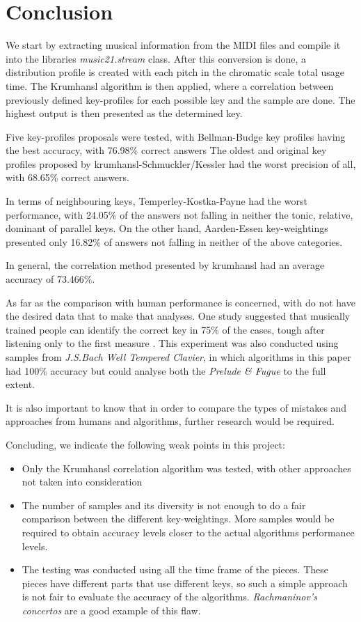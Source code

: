 \section{Conclusion} \label{sec:conclusion}

We start by extracting musical information from the MIDI files and compile it into the libraries \textit{music21.stream} class.
After this conversion is done, a distribution profile is created with each pitch in the chromatic scale total usage time.
The Krumhansl algorithm is then applied, where a correlation between previously defined key-profiles for each possible key and the sample are done.
The highest output is then presented as the determined key.

Five key-profiles proposals were tested, with Bellman-Budge key profiles having the best accuracy, with 76.98\% correct answers
The oldest and original key profiles proposed by krumhansl-Schmuckler/Kessler had the worst precision of all, with 68.65\% correct answers.

In terms of neighbouring keys, Temperley-Kostka-Payne had the worst performance, with 24.05\% of the answers not falling in neither the tonic, relative, dominant of parallel keys.
On the other hand, Aarden-Essen key-weightings presented only 16.82\% of answers not falling in neither of the above categories.

In general, the correlation method presented by krumhansl had an average accuracy of 73.466\%.

As far as the comparison with human performance is concerned, with do not have the desired data that to make that analyses.
One study suggested that musically trained people can identify the correct key in 75\% of the cases, tough after listening only to the first measure \cite{cohen1977tonality}.
This experiment was also conducted using samples from \textit{J.S.Bach Well Tempered Clavier}, in which algorithms in this paper had 100\% accuracy but could analyse both the \textit{Prelude \& Fugue} to the full extent.

It is also important to know that in order to compare the types of mistakes and approaches from humans and algorithms, further research would be required.

Concluding, we indicate the following weak points in this project:
\begin{itemize}
    \item Only the Krumhansl correlation algorithm was tested, with other approaches not taken into consideration
    \item The number of samples and its diversity is not enough to do a fair comparison between the different key-weightings. More samples would be required to obtain accuracy levels closer to the actual algorithms performance levels.
    \item The testing was conducted using all the time frame of the pieces. These pieces have different parts that use different keys, so such a simple approach is not fair to evaluate the accuracy of the algorithms. \textit{Rachmaninov's concertos} are a good example of this flaw.
\end{itemize}